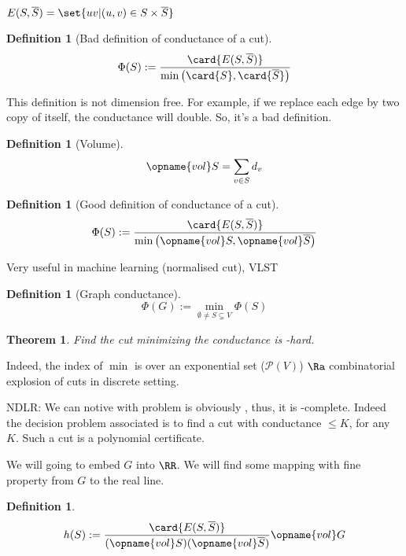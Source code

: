 \documentclass[12pt]{article}
\newtheorem{theorem}[lemma]{Theorem}
\newtheorem{definition}[lemma]{Definition}
\begin{document}
\begin{notation}
    $E(S,\overline{S}) = \set{uv\vert (u,v)\in S\times\overline{S}}$
\end{notation}    
    
\begin{definition}[Bad definition of conductance of a cut]
    \[
        \Phi(S) := \frac{\card{E(S,\overline{S})}}{\min\left(\card{S},\card{\overline{S}}\right)}
    \]
\end{definition}

This definition is not dimension free. For example, if we replace each edge by two copy of itself, the conductance will double. So, it's a bad definition.

\begin{definition}[Volume]
    \[
        \opname{vol} S = \sum\limits_{v\in S}d_v
    \]
\end{definition}
    
\begin{definition}[Good definition of conductance of a cut]
    \[
        \Phi(S) := \frac{\card{E(S,\overline{S})}}{\min\left(\opname{vol} S,\opname{vol} \overline{S}\right)}
    \]
\end{definition}

Very useful in machine learning (normalised cut), VLST %

\begin{definition}[Graph conductance]
    \[
        \Phi(G) := \min\limits_{\emptyset \neq S \subsetneq V} \Phi(S)
    \]
\end{definition}

\begin{theorem}
    Find the cut minimizing the conductance is \NP-hard.
\end{theorem}
Indeed, the index of $\min$ is over an exponential set ($\mathcal{P}(V)$) $\Ra$ combinatorial explosion of cuts in discrete setting.

NDLR: We can notive with problem is obviously \NP, thus, it is \NP-complete. Indeed the decision problem associated is to find a cut with conductance $\leqslant K$, for any $K$. Such a cut is a polynomial certificate.

We will going to embed $G$ into $\RR$. We will find some mapping with fine property from $G$ to the real line.

\begin{definition}
    \[
        h(S) := \frac{\card{E(S,\overline{S})}}{(\opname{vol} S)(\opname{vol} \overline{S})} \opname{vol} G
    \]
\end{definition}
\end{document}
